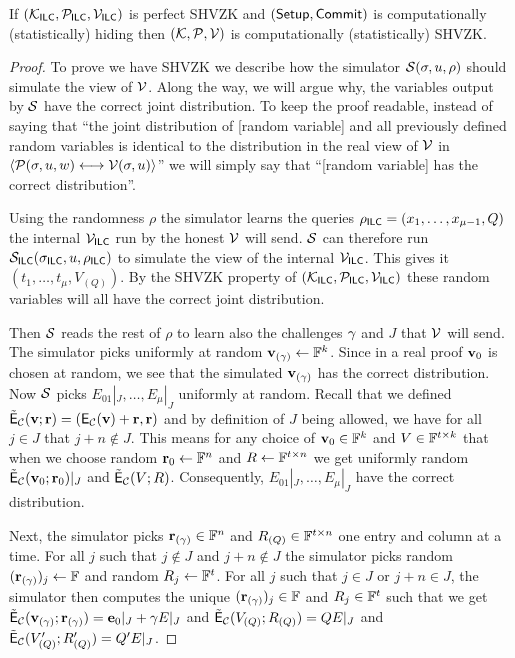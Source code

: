 \begin{theorem}[SHVZK]
If $(\mathcal{K}_{\mathsf{ILC}},\mathcal{P}_{\mathsf{ILC}},\mathcal{V}_{\mathsf{ILC}})$ is perfect SHVZK 
and $(\mathsf{Setup},\mathsf{Commit})$ is computationally (statistically) hiding then $(\mathcal{K},\mathcal{P},\mathcal{V})$ is computationally (statistically) SHVZK.
\end{theorem}
\begin{proof}
To prove we have SHVZK we describe how the simulator $\mathcal{S}(\mathsf{\sigma},u,\rho)$ should simulate the view of $\mathcal{V}$. Along the way, we will argue why, the variables output by $\mathcal{S}$ have the correct joint distribution. To keep the proof readable, instead of saying that ``the joint distribution of [random variable] and all previously defined random variables is identical to the distribution in the real view of $\mathcal{V}$ in $\langle \mathcal{P}(\mathsf{\sigma},u,w)\longleftrightarrow \mathcal{V}(\mathsf{\sigma},u)\rangle$'' we will simply say that ``[random variable] has the correct distribution''.

Using the randomness $\rho$ the simulator learns the queries $\rho_{\mathsf{ILC}}=(x_1,\ldots,x_{\mu-1},Q)$ the internal $\mathcal{V}_{\mathsf{ILC}}$ run by the honest $\mathcal{V}$ will send. $\mathcal{S}$ can therefore run $\mathcal{S}_{\mathsf{ILC}}(\mathsf{\sigma}_{\mathsf{ILC}},u,\rho_{\mathsf{ILC}})$ to simulate the view of the internal $\mathcal{V}_{\mathsf{ILC}}$. This gives it $(t_1,\ldots,t_\mu,V_{(Q)})$. By the SHVZK property of $(\mathcal{K}_{\mathsf{ILC}},\mathcal{P}_{\mathsf{ILC}},\mathcal{V}_{\mathsf{ILC}})$ these random variables will all have the correct joint distribution. 

Then $\mathcal{S}$ reads the rest of $\rho$ to learn also the challenges ${\mathbf{\gamma}}$ and $J$ that $\mathcal{V}$ will send. The simulator picks uniformly at random ${\mathbf{v}}_{(\mathbf{\gamma})}\gets \mathbb{F}^{k}$. Since in a real proof ${\mathbf{v}}_0$ is chosen at random, we see that the simulated ${\mathbf{v}}_{(\mathbf{\gamma})}$ has the correct distribution. Now $\mathcal{S}$ picks $E_{01}|_J,\ldots,E_{\mu}|_J$ uniformly at random. Recall that we defined $\tilde{\mathsf{E}}_{\mathcal{C}}({\mathbf{v}};\mathbf{r})=(\mathsf{E}_{\mathcal{C}}({\mathbf{v}})+\mathbf{r},\mathbf{r})$ and by definition of $J$ being allowed, we have for all $j\in J$ that $j+n\notin J$. This means for any choice of ${\mathbf{v}}_0\in \mathbb{F}^{k}$ and $V\in \mathbb{F}^{t\times k}$ that when we choose random $\mathbf{r}_0\gets \mathbb{F}^n$ and $R\gets \mathbb{F}^{t\times n}$ we get uniformly random $\tilde{\mathsf{E}}_{\mathcal{C}}({\mathbf{v}}_0;\mathbf{r}_0)|_J$ and $\tilde{\mathsf{E}}_{\mathcal{C}}(V;R)$. Consequently, $E_{01}|_J,\ldots,E_{\mu}|_J$ have the correct distribution.

Next, the simulator picks $\mathbf{r}_{(\mathbf{\gamma})}\in \mathbb{F}^n$ and $R_{(Q)}\in \mathbb{F}^{t\times n}$ one entry and column at a time. For all $j$ such that $j\notin J$ and $j+n\notin J$ the simulator picks random $(\mathbf{r}_{(\mathbf{\gamma})})_j\gets \mathbb{F}$ and random $R_j\gets \mathbb{F}^t$. For all $j$ such that $j\in J$ or $j+n\in J$, the simulator then computes the unique $(\mathbf{r}_{(\mathbf{\gamma})})_j\in \mathbb{F}$ and $R_j\in \mathbb{F}^t$ such that we get $\tilde{\mathsf{E}}_{\mathcal{C}}({\mathbf{v}}_{(\mathbf{\gamma})};\mathbf{r}_{(\mathbf{\gamma})})=\mathbf{e}_0|_J+{\mathbf{\gamma}} E|_J$ and $\tilde{\mathsf{E}}_{\mathcal{C}}(V_{(Q)};R_{(Q)})=QE|_J$ and $\tilde{\mathsf{E}}_{\mathcal{C}}(V'_{(Q)};R'_{(Q)})=Q'E|_J$.


\end{proof}
